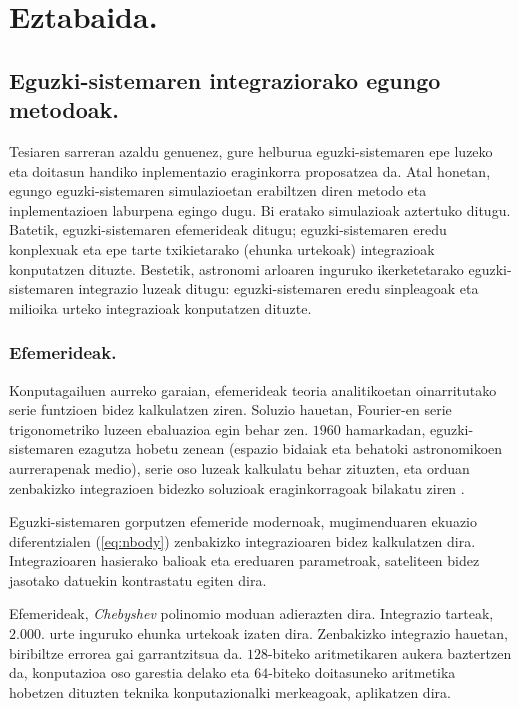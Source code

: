 \chapter{Eztabaida.}

\section{Eguzki-sistemaren integraziorako egungo metodoak.}


Tesiaren sarreran azaldu genuenez, gure helburua eguzki-sistemaren epe luzeko eta doitasun handiko inplementazio eraginkorra proposatzea da. Atal honetan, egungo eguzki-sistemaren simulazioetan erabiltzen diren metodo eta inplementazioen laburpena egingo dugu. Bi eratako simulazioak aztertuko ditugu. Batetik, eguzki-sistemaren  efemerideak ditugu; eguzki-sistemaren eredu konplexuak eta epe tarte txikietarako (ehunka urtekoak) integrazioak konputatzen dituzte. Bestetik, astronomi arloaren inguruko ikerketetarako eguzki-sistemaren integrazio luzeak ditugu: eguzki-sistemaren eredu sinpleagoak eta milioika urteko integrazioak konputatzen dituzte. 

\subsection*{Efemerideak.}

Konputagailuen aurreko garaian, efemerideak teoria analitikoetan oinarritutako serie funtzioen bidez kalkulatzen ziren. Soluzio hauetan, Fourier-en serie trigonometriko luzeen ebaluazioa egin behar zen. $1960$ hamarkadan, eguzki-sistemaren ezagutza hobetu zenean (espazio bidaiak eta behatoki astronomikoen aurrerapenak medio), serie oso luzeak kalkulatu behar zituzten, eta orduan zenbakizko integrazioen bidezko soluzioak eraginkorragoak bilakatu ziren \cite{Kaplan2015}.   
   
Eguzki-sistemaren gorputzen efemeride modernoak, mugimenduaren ekuazio diferentzialen (\ref{eq:nbody}) zenbakizko integrazioaren bidez kalkulatzen dira. Integrazioaren hasierako balioak eta ereduaren parametroak, sateliteen bidez jasotako datuekin kontrastatu egiten dira.

Efemerideak, \emph{Chebyshev} polinomio moduan adierazten dira. Integrazio tarteak, $2.000.$ urte inguruko ehunka urtekoak izaten dira. Zenbakizko integrazio hauetan, biribiltze errorea gai garrantzitsua da. $128$-biteko aritmetikaren aukera baztertzen da, konputazioa oso garestia delako eta $64$-biteko doitasuneko aritmetika hobetzen dituzten teknika konputazionalki merkeagoak, aplikatzen dira. 

